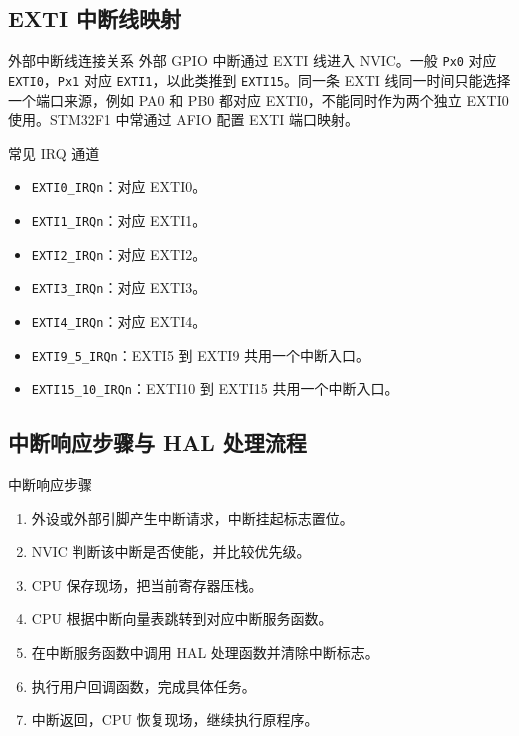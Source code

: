 \documentclass[UTF8,fontset=none,12pt]{ctexart}
\newcommand{\api}[1]{{\footnotesize\nolinkurl{#1}}}
\begin{document}
\subsection{EXTI 中断线映射}
\begin{pointbox}{外部中断线连接关系}
外部 GPIO 中断通过 EXTI 线进入 NVIC。一般 \api{Px0} 对应 \api{EXTI0}，\api{Px1} 对应 \api{EXTI1}，以此类推到 \api{EXTI15}。同一条 EXTI 线同一时间只能选择一个端口来源，例如 PA0 和 PB0 都对应 EXTI0，不能同时作为两个独立 EXTI0 使用。STM32F1 中常通过 AFIO 配置 EXTI 端口映射。
\end{pointbox}

\begin{pointbox}{常见 IRQ 通道}
\begin{itemize}
  \item \api{EXTI0_IRQn}：对应 EXTI0。
  \item \api{EXTI1_IRQn}：对应 EXTI1。
  \item \api{EXTI2_IRQn}：对应 EXTI2。
  \item \api{EXTI3_IRQn}：对应 EXTI3。
  \item \api{EXTI4_IRQn}：对应 EXTI4。
  \item \api{EXTI9_5_IRQn}：EXTI5 到 EXTI9 共用一个中断入口。
  \item \api{EXTI15_10_IRQn}：EXTI10 到 EXTI15 共用一个中断入口。
\end{itemize}
\end{pointbox}

\subsection{中断响应步骤与 HAL 处理流程}
\begin{pointbox}{中断响应步骤}
\begin{enumerate}
  \item 外设或外部引脚产生中断请求，中断挂起标志置位。
  \item NVIC 判断该中断是否使能，并比较优先级。
  \item CPU 保存现场，把当前寄存器压栈。
  \item CPU 根据中断向量表跳转到对应中断服务函数。
  \item 在中断服务函数中调用 HAL 处理函数并清除中断标志。
  \item 执行用户回调函数，完成具体任务。
  \item 中断返回，CPU 恢复现场，继续执行原程序。
\end{enumerate}
\end{pointbox}
\end{document}
